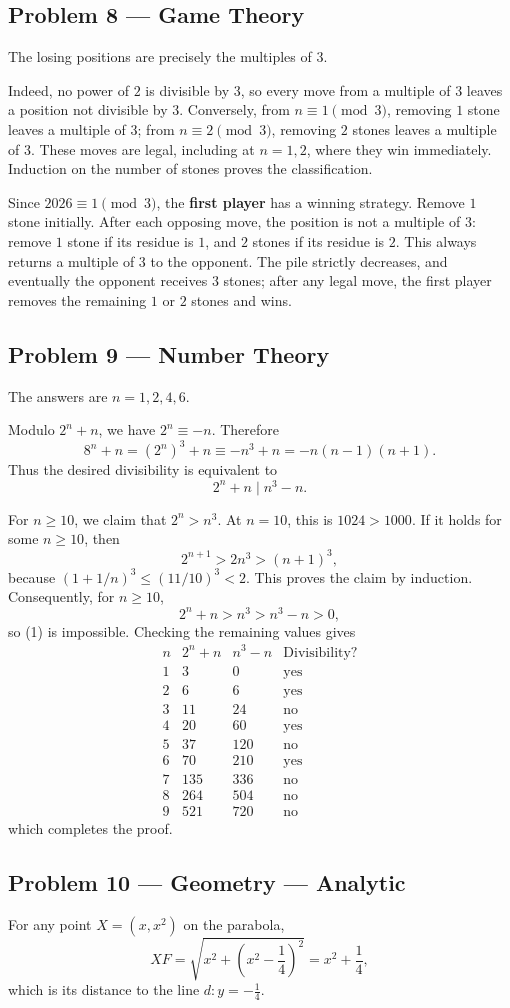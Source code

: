 \documentclass[11pt,a4paper]{article}
\newcommand{\solution}[2]{\subsection*{Problem #1 --- #2}}
\begin{document}
\solution{8}{Game Theory}
The losing positions are precisely the multiples of $3$.

Indeed, no power of $2$ is divisible by $3$, so every move from a multiple of
$3$ leaves a position not divisible by $3$. Conversely, from $n\equiv1\pmod3$,
removing $1$ stone leaves a multiple of $3$; from $n\equiv2\pmod3$, removing
$2$ stones leaves a multiple of $3$. These moves are legal, including at
$n=1,2$, where they win immediately. Induction on the number of stones proves
the classification.

Since $2026\equiv1\pmod3$, the \textbf{first player} has a winning strategy.
Remove $1$ stone initially. After each opposing move, the position is not a
multiple of $3$: remove $1$ stone if its residue is $1$, and $2$ stones if its
residue is $2$. This always returns a multiple of $3$ to the opponent. The
pile strictly decreases, and eventually the opponent receives $3$ stones;
after any legal move, the first player removes the remaining $1$ or $2$
stones and wins.

\solution{9}{Number Theory}
The answers are $\boxed{n=1,2,4,6}$.

Modulo $2^n+n$, we have $2^n\equiv-n$. Therefore
\[
  8^n+n=(2^n)^3+n\equiv-n^3+n=-n(n-1)(n+1).
\]
Thus the desired divisibility is equivalent to
\[
  2^n+n\mid n^3-n. \tag{1}
\]

For $n\ge10$, we claim that $2^n>n^3$. At $n=10$, this is $1024>1000$. If it
holds for some $n\ge10$, then
\[
  2^{n+1}>2n^3>(n+1)^3,
\]
because $(1+1/n)^3\le(11/10)^3<2$. This proves the claim by induction.
Consequently, for $n\ge10$,
\[
  2^n+n>n^3>n^3-n>0,
\]
so (1) is impossible. Checking the remaining values gives
\[
\begin{array}{c|c|c|c}
 n&2^n+n&n^3-n&\text{Divisibility?}\\ \hline
 1&3&0&\text{yes}\\
 2&6&6&\text{yes}\\
 3&11&24&\text{no}\\
 4&20&60&\text{yes}\\
 5&37&120&\text{no}\\
 6&70&210&\text{yes}\\
 7&135&336&\text{no}\\
 8&264&504&\text{no}\\
 9&521&720&\text{no}
\end{array}
\]
which completes the proof.

\clearpage
\solution{10}{Geometry --- Analytic}
For any point $X=(x,x^2)$ on the parabola,
\[
  XF=\sqrt{x^2+\left(x^2-\frac14\right)^2}
  =x^2+\frac14,
\]
which is its distance to the line $d:y=-\frac14$.
\end{document}
